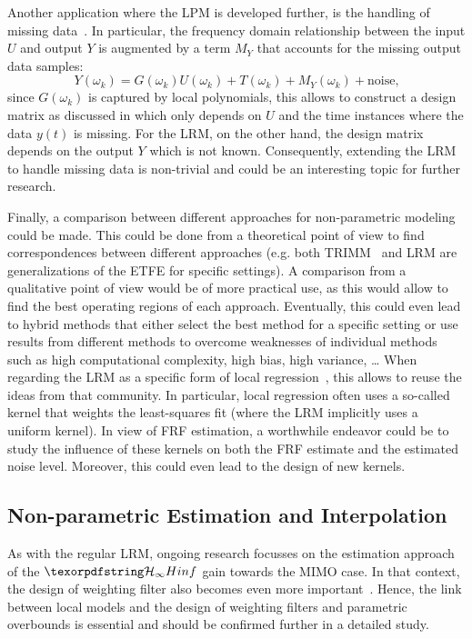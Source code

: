    Another application where the \gls{LPM} is developed further, is the handling of missing data~\citep{Ugryumova2015}.
    In particular, the frequency domain relationship between the input $U$ and output $Y$ is augmented by a term $M_Y$ that accounts for the missing output data samples:
    \begin{equation}
      Y(\omega_k) = G(\omega_k) U(\omega_k) + T(\omega_k) + M_Y(\omega_k) + \mathrm{noise}\text{,}
    \end{equation}
    since $G(\omega_k)$ is captured by local polynomials, this allows to construct a design matrix as discussed in  which only depends on $U$ and the time instances where the data $y(t)$ is missing.
    For the \gls{LRM}, on the other hand, the design matrix depends on the output $Y$ which is not known.
    Consequently, extending the \gls{LRM} to handle missing data is non-trivial and could be an interesting topic for further research.

    Finally, a comparison between different approaches for non-parametric modeling~\citep{Hagg2012,Stenman2001ASFRF,Gevers2011lpm} could be made.
    This could be done from a theoretical point of view to find correspondences between different approaches (e.g. both \gls{TRIMM}~\citep{Hagg2012} and \gls{LRM} are generalizations of the \gls{ETFE} for specific settings).
    A comparison from a qualitative point of view would be of more practical use, as this would allow to find the best operating regions of each approach.
    Eventually, this could even lead to hybrid methods that either select the best method for a specific setting or use results from different methods to overcome weaknesses of individual methods such as high computational complexity, high bias, high variance, \ldots
    When regarding the \gls{LRM} as a specific form of local regression~\citep{Loader1999}, this allows to reuse the ideas from that community.
    In particular, local regression often uses a so-called kernel that weights the least-squares fit (where the \gls{LRM} implicitly uses a uniform kernel).
    In view of \gls{FRF} estimation, a worthwhile endeavor could be to study the influence of these kernels on both the \gls{FRF} estimate and the estimated noise level.
    Moreover, this could even lead to the design of new kernels.

  \subsection{Non-parametric Estimation and Interpolation}
  As with the regular \gls{LRM}, ongoing research focusses on the estimation approach of the $\Hinf{}$ gain towards the \gls{MIMO} case.
  In that context, the design of weighting filter also becomes even more important~\citep{Boeren2013}.
  Hence, the link between local models and the design of weighting filters and parametric overbounds is essential and should be confirmed further in a detailed study.


